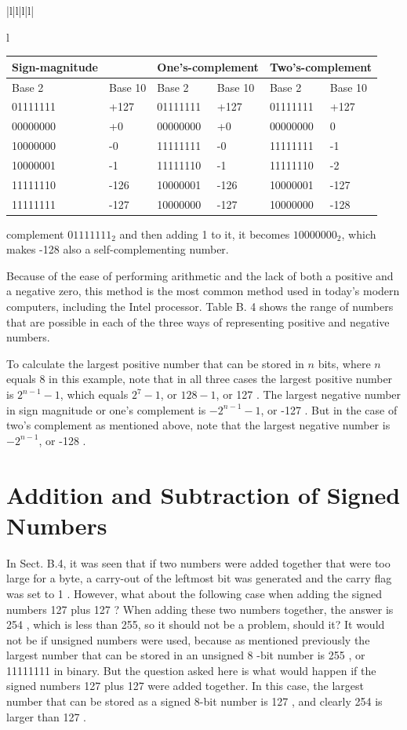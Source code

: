 \documentclass[10pt]{book}
\begin{document}
\begin{center}
\begin{tabular}{|l|l|l|l|}
\begin{tabular}{l}
\begin{center}
\begin{tabular}{|l|l|l|l|l|l|}
\hline
Sign-magnitude &  & \multicolumn{2}{|l|}{One's-complement} & \multicolumn{2}{l|}{Two's-complement} \\
\hline
Base 2 & Base 10 & Base 2 & Base 10 & Base 2 & Base 10 \\
\hline
01111111 & +127 & 01111111 & +127 & 01111111 & +127 \\
\hline
00000000 & +0 & 00000000 & +0 & 00000000 & 0 \\
\hline
10000000 & -0 & 11111111 & -0 & 11111111 & -1 \\
\hline
10000001 & -1 & 11111110 & -1 & 11111110 & -2 \\
\hline
11111110 & -126 & 10000001 & -126 & 10000001 & -127 \\
\hline
11111111 & -127 & 10000000 & -127 & 10000000 & -128 \\
\hline
\end{tabular}
\end{center}

complement $01111111_{2}$ and then adding 1 to it, it becomes $10000000_{2}$, which makes -128 also a self-complementing number.

Because of the ease of performing arithmetic and the lack of both a positive and a negative zero, this method is the most common method used in today's modern computers, including the Intel processor. Table B. 4 shows the range of numbers that are possible in each of the three ways of representing positive and negative numbers.

To calculate the largest positive number that can be stored in $n$ bits, where $n$ equals 8 in this example, note that in all three cases the largest positive number is $2^{n-1}-1$, which equals $2^{7}-1$, or $128-1$, or 127 . The largest negative number in sign magnitude or one's complement is $-2^{n-1}-1$, or -127 . But in the case of two's complement as mentioned above, note that the largest negative number is $-2^{n-1}$, or -128 .

\section{Addition and Subtraction of Signed Numbers}
In Sect. B.4, it was seen that if two numbers were added together that were too large for a byte, a carry-out of the leftmost bit was generated and the carry flag was set to 1 . However, what about the following case when adding the signed numbers 127 plus 127 ? When adding these two numbers together, the answer is 254 , which is less than 255, so it should not be a problem, should it? It would not be if unsigned numbers were used, because as mentioned previously the largest number that can be stored in an unsigned 8 -bit number is 255 , or 11111111 in binary. But the question asked here is what would happen if the signed numbers 127 plus 127 were added together. In this case, the largest number that can be stored as a signed 8-bit number is 127 , and clearly 254 is larger than 127 .


\end{tabular}
\end{tabular}
\end{center}
\end{document}
